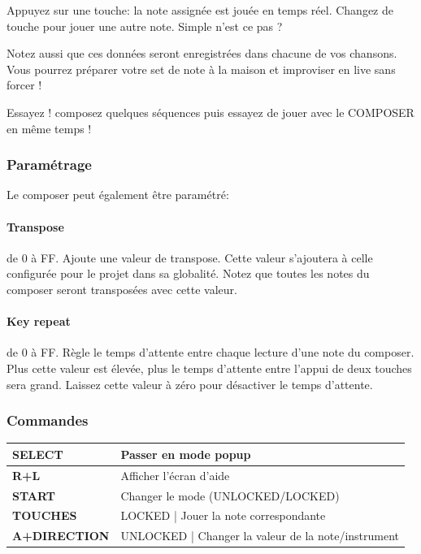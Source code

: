 \documentclass[12pt,a4paper]{article}
\begin{document}
    Appuyez sur une touche: la note assignée est jouée en temps réel.
    Changez de touche pour jouer une autre note. Simple n'est ce pas ?
    \medskip
    
    Notez aussi que ces données seront enregistrées dans chacune de vos chansons.
    Vous pourrez préparer votre set de note à la maison et improviser en live sans forcer !
    \medskip
    
    Essayez ! composez quelques séquences puis essayez de jouer avec le COMPOSER en même temps !
    \medskip
    
    \subsubsection{Paramétrage}
    
    Le composer peut également être paramétré:
    
    
    \paragraph{Transpose} de 0 à FF.
    Ajoute une valeur de transpose.
    Cette valeur s'ajoutera à celle configurée pour le projet dans sa globalité.
    Notez que toutes les notes du composer seront transposées avec cette valeur.

    \paragraph{Key repeat} de 0 à FF.
    Règle le temps d'attente entre chaque lecture d'une note du composer.
    Plus cette valeur est élevée, plus le temps d'attente entre l'appui de deux touches sera grand.
    Laissez cette valeur à zéro pour désactiver le temps d'attente.

    \subsubsection{Commandes}

    \tablelasttail{\hline}
    \begin{supertabular}{|l|p{11cm}|}
    \hline
        {\bf SELECT} & Passer en mode popup \\
        \hline
        {\bf R+L} & Afficher l'écran d'aide \\
        \hline
        {\bf START} & Changer le mode (UNLOCKED/LOCKED) \\
        \hline
        {\bf TOUCHES} & LOCKED | Jouer la note correspondante \\
        \hline
        {\bf A+DIRECTION} & UNLOCKED | Changer la valeur de la note/instrument \\
    \hline
    \end{supertabular}
\end{document}
